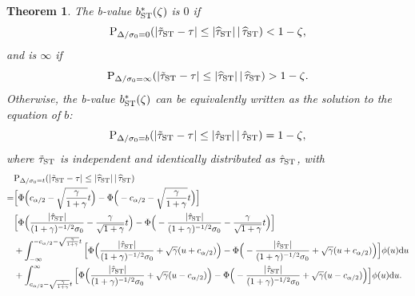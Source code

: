 \documentclass[11pt]{article}
\def\given{\,|\,}
\def\P{{\mathrm P}}
\def\d{{\mathrm d}}
\newcommand{\htau}{\widehat\tau}
\numberwithin{equation}{section}
\newtheorem{theorem}{Theorem}[section]
\theoremstyle{definition}
\begin{document}
\begin{theorem}\label{thm:b_ST}
  The b-value $b^*_{\rm ST}(\zeta)$ is $0$ if
  \[
    \P_{\Delta/\sigma_0 = 0}(\lvert \tilde\tau_{\rm ST} - \tau \rvert \le \lvert \htau_{\rm ST} \rvert \given \htau_{\rm ST}) < 1-\zeta,
  \]
  and is $\infty$ if
  \[
    \P_{\Delta/\sigma_0 = \infty}(\lvert \tilde\tau_{\rm ST} - \tau \rvert \le \lvert \htau_{\rm ST} \rvert \given \htau_{\rm ST}) > 1-\zeta.
  \]
  Otherwise, the b-value $b^*_{\rm ST}(\zeta)$ can be equivalently written as the solution to the equation of $b$:
  \[
    \P_{\Delta/\sigma_0 = b}(\lvert \tilde\tau_{\rm ST} - \tau \rvert \le \lvert \hat\tau_{\rm ST}\rvert \given \hat\tau_{\rm ST}) = 1-\zeta,
  \]
  where $\tilde\tau_{\rm ST}$ is independent and identically distributed as $\hat\tau_{\rm ST}$, with
  \begin{align*}
    &\P_{\Delta/\sigma_0 = t}(\lvert \tilde\tau_{\rm ST} - \tau \rvert \le \lvert \htau_{\rm ST} \rvert \given \htau_{\rm ST}) \\
    =& \Big[\Phi\Big(c_{\alpha/2} - \sqrt{\frac{\gamma}{1+\gamma}}t \Big) - \Phi\Big(-c_{\alpha/2} - \sqrt{\frac{\gamma}{1+\gamma}}t \Big)\Big]\\
    &\Big[\Phi\Big(\frac{\lvert  \hat\tau_{\rm ST}\rvert}{(1+\gamma)^{-1/2} \sigma_0} - \frac{\gamma}{\sqrt{1+\gamma}} t \Big) - \Phi\Big(-\frac{\lvert  \hat\tau_{\rm ST}\rvert}{(1+\gamma)^{-1/2} \sigma_0}- \frac{\gamma}{\sqrt{1+\gamma}} t\Big)\Big]\\
    &+ \int_{-\infty}^{-c_{\alpha/2} - \sqrt{\frac{\gamma}{1+\gamma}}t} \Big[\Phi\Big(\frac{\lvert  \hat\tau_{\rm ST}\rvert}{(1+\gamma)^{-1/2} \sigma_0} + \sqrt{\gamma} (u+c_{\alpha/2})\Big) - \Phi\Big(-\frac{\lvert  \hat\tau_{\rm ST}\rvert}{(1+\gamma)^{-1/2} \sigma_0} +  \sqrt{\gamma} (u+c_{\alpha/2})\Big)\Big] \phi(u) \d u\\
    &+ \int_{c_{\alpha/2} - \sqrt{\frac{\gamma}{1+\gamma}}t}^\infty \Big[\Phi\Big(\frac{\lvert  \hat\tau_{\rm ST}\rvert}{(1+\gamma)^{-1/2} \sigma_0} + \sqrt{\gamma} (u-c_{\alpha/2})\Big) - \Phi\Big(-\frac{\lvert  \hat\tau_{\rm ST}\rvert}{(1+\gamma)^{-1/2} \sigma_0} + \sqrt{\gamma} (u-c_{\alpha/2})\Big)\Big] \phi(u) \d u.
  \end{align*}
\end{theorem}


\end{document}
